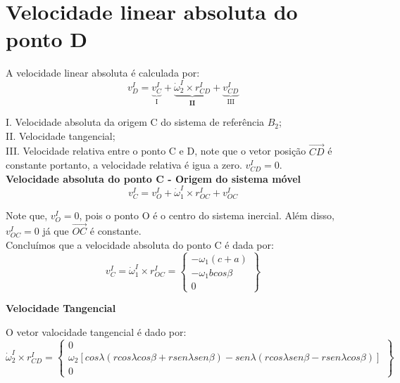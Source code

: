 \documentclass[a4paper, 12pt]{article}
\begin{document}
\section{Velocidade linear absoluta do ponto D}
	A velocidade linear absoluta é calculada por:
	\begin{equation}
		v_D^I = \underbrace{v_C^I}_\text{I} + \underbrace{\dot{\omega}^I_2 \times r^I_{CD}}_\textbf{II} + \underbrace{v^I_{CD}}_\text{III}
 	\end{equation}
	
I. Velocidade absoluta da origem C do sistema de referência $B_2$;\\

II. Velocidade tangencial;\\

III. Velocidade relativa entre o ponto C e D, note que o vetor posição $\vec{CD}$ é constante portanto, a velocidade relativa é igua a zero. $v^I_{CD} = 0$.\\

	\textbf{Velocidade absoluta do ponto C - Origem do sistema móvel}
		\begin{equation}
			v_C^I = v_O^I + \dot{\omega}^I_1 \times r^I_{OC} + v^I_{OC}
		\end{equation}
		
		Note que, $v_O^I = 0$, pois o ponto O é o centro do sistema inercial. Além disso, $v^I_{OC} = 0$ já que $\vec{OC}$ é constante.\\
		
		Concluímos que a velocidade absoluta do ponto C é dada por:
		\begin{equation}
			v_C^I = \dot{\omega}^I_1 \times r^I_{OC} = \begin{Bmatrix}
			-\omega_1(c+a)\\
			-\omega_1bcos\beta\\
			0
			\end{Bmatrix}
		\end{equation}
		
	\textbf{Velocidade Tangencial}
	
		O vetor valocidade tangencial é dado por:
		\begin{equation}
			\dot{\omega}^I_2 \times r^I_{CD} = \begin{Bmatrix}
			0\\
			\omega_2[cos\lambda(rcos\lambda cos\beta + rsen\lambda sen\beta) - sen\lambda (rcos\lambda sen \beta - rsen\lambda cos\beta)]\\
			0
			\end{Bmatrix}
		\end{equation}
		
\end{document}
